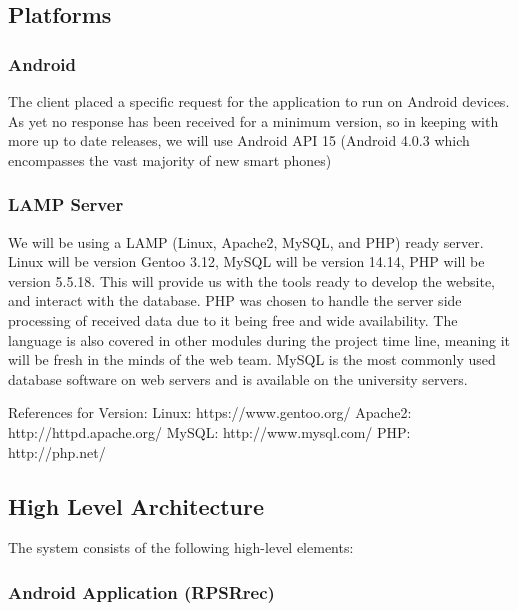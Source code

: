 \subsection{Platforms}
	\subsubsection{Android}
		The client placed a specific request for the application to run on Android devices. As yet no response has been received for a minimum version, so in keeping with more up to date releases, we will use Android API 15 (Android 4.0.3 which encompasses the vast majority of new smart phones)

	\subsubsection{LAMP Server}
		We will be using a LAMP (Linux, Apache2, MySQL, and PHP) ready server. Linux will be version Gentoo 3.12, MySQL will be version 14.14, PHP will be version 5.5.18. This will provide us with the tools ready to develop the website, and interact with the database. PHP was chosen to handle the server side processing of received data due to it being free and wide availability. The language is also covered in other modules during the project time line, meaning it will be fresh in the minds of the web team. MySQL is the most commonly used database software on web servers and is available on the university servers. 

References for Version: 
Linux: https://www.gentoo.org/
Apache2: http://httpd.apache.org/
MySQL: http://www.mysql.com/
PHP: http://php.net/
\newpage
\subsection{High Level Architecture}
	The system consists of the following high-level elements:

\subsubsection{Android Application (RPSRrec)}

